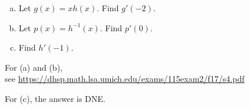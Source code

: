 \documentclass[11pt]{exam}
\begin{document}
\begin{questions}
\begin{minipage}{0.5\linewidth}
            \begin{enumerate}[(a)]
            \item Let $g(x) = xh(x)$. Find $g'(-2)$.
            \item Let $p(x) = h^{-1}(x)$. Find $p'(0)$.
            \item Find $h'(-1)$.
            \end{enumerate}
        \end{minipage}
        \begin{solution}
          For (a) and (b),\\ see \href{https://dhsp.math.lsa.umich.edu/exams/115exam2/f17/s4.pdf}{https://dhsp.math.lsa.umich.edu/exams/115exam2/f17/s4.pdf}

          For (c), the answer is DNE.
        \end{solution}
\end{questions}
\end{document}
